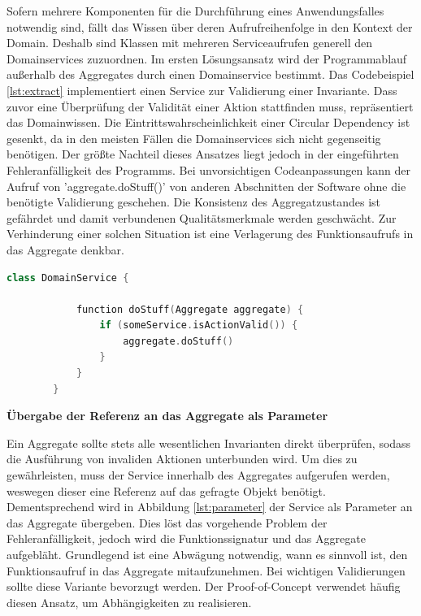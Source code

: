 Sofern mehrere Komponenten für die Durchführung eines Anwendungsfalles notwendig sind, fällt das Wissen über deren Aufrufreihenfolge in den Kontext der Domain. Deshalb sind Klassen mit mehreren Serviceaufrufen generell den Domainservices zuzuordnen. Im ersten Lösungsansatz wird der Programmablauf außerhalb des Aggregates durch einen Domainservice bestimmt. Das Codebeispiel \ref{lst:extract} implementiert einen Service zur Validierung einer Invariante. Dass zuvor eine Überprüfung der Validität einer Aktion stattfinden muss, repräsentiert das Domainwissen. Die Eintrittswahrscheinlichkeit einer Circular Dependency ist gesenkt, da in den meisten Fällen die Domainservices sich nicht gegenseitig benötigen. Der größte Nachteil dieses Ansatzes liegt jedoch in der eingeführten Fehleranfälligkeit des Programms. Bei unvorsichtigen Codeanpassungen kann der Aufruf von 'aggregate.doStuff()' von anderen Abschnitten der Software ohne die benötigte Validierung geschehen. Die Konsistenz des Aggregatzustandes ist gefährdet und damit verbundenen Qualitätsmerkmale werden geschwächt. Zur Verhinderung einer solchen Situation ist eine Verlagerung des Funktionsaufrufs in das Aggregate denkbar.

\begin{minipage}{\linewidth} %
	\begin{lstlisting}[caption={Bestimmung des Steuerflusses durch einen Domainservice}, label={lst:extract}, language=Kotlin]
		class DomainService {
			
			function doStuff(Aggregate aggregate) {
				if (someService.isActionValid()) {     
					aggregate.doStuff()
				}
			}
		}
	\end{lstlisting}
\end{minipage}


\textbf{Übergabe der Referenz an das Aggregate als Parameter}

Ein Aggregate sollte stets alle wesentlichen Invarianten direkt überprüfen, sodass die Ausführung von invaliden Aktionen unterbunden wird. Um dies zu gewährleisten, muss der Service innerhalb des Aggregates aufgerufen werden, weswegen dieser eine Referenz auf das gefragte Objekt benötigt. Dementsprechend wird in Abbildung \ref{lst:parameter} der Service als Parameter an das Aggregate übergeben. Dies löst das vorgehende Problem der Fehleranfälligkeit, jedoch wird die Funktionssignatur und das Aggregate aufgebläht. Grundlegend ist eine Abwägung notwendig, wann es sinnvoll ist, den Funktionsaufruf in das Aggregate mitaufzunehmen. Bei wichtigen Validierungen sollte diese Variante bevorzugt werden. Der Proof-of-Concept verwendet häufig diesen Ansatz, um Abhängigkeiten zu realisieren.

